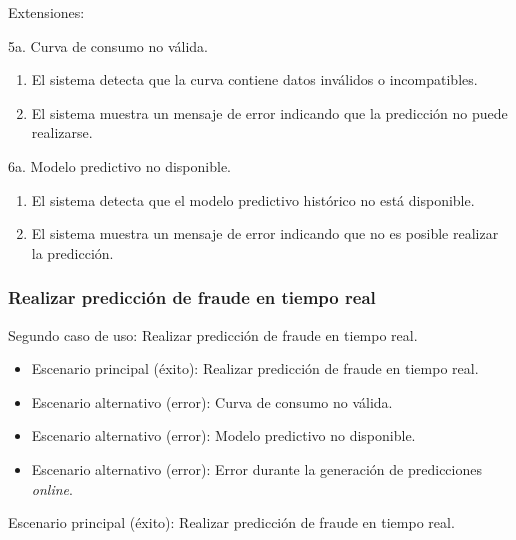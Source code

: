 \documentclass[12pt,a4paper]{report}
\begin{document}
\medskip

\noindent Extensiones:

5a. Curva de consumo no válida.
\begin{enumerate}[leftmargin=1.5cm]
    \item El sistema detecta que la curva contiene datos inválidos o incompatibles.
    \item El sistema muestra un mensaje de error indicando que la predicción no puede realizarse.
\end{enumerate}

\medskip

6a. Modelo predictivo no disponible.
\begin{enumerate}[leftmargin=1.5cm]
    \item El sistema detecta que el modelo predictivo histórico no está disponible.
    \item El sistema muestra un mensaje de error indicando que no es posible realizar la predicción.
\end{enumerate}

\medskip

\subsubsection{Realizar predicción de fraude en tiempo real}

\noindent Segundo caso de uso: Realizar predicción de fraude en tiempo real.

\begin{itemize}[leftmargin=1.5cm]
    \item Escenario principal (éxito): Realizar predicción de fraude en tiempo real.
    \item Escenario alternativo (error): Curva de consumo no válida.
    \item Escenario alternativo (error): Modelo predictivo no disponible.
    \item Escenario alternativo (error): Error durante la generación de predicciones \emph{online}.
\end{itemize}

\medskip

\noindent Escenario principal (éxito): Realizar predicción de fraude en tiempo real.
\end{document}
